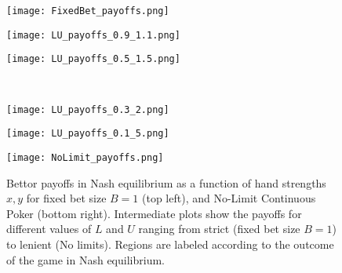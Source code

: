\documentclass[../../main/main.tex]{subfiles}
\begin{document}
\begin{figure}[h!]
    \begin{adjustwidth}{-1in}{-1in}
        \centering
        \begin{minipage}{0.4\textwidth}
            \centering
            \texttt{[image: FixedBet\_payoffs.png]}
        \end{minipage}
        \hspace{0.02\textwidth}
        \begin{minipage}{0.4\textwidth}
            \centering
            \texttt{[image: LU\_payoffs\_0.9\_1.1.png]}
        \end{minipage}
        \hspace{0.02\textwidth}
        \begin{minipage}{0.4\textwidth}
            \centering
            \texttt{[image: LU\_payoffs\_0.5\_1.5.png]}
        \end{minipage}
        \vspace{-0.5cm}\\ %
        \begin{minipage}{0.4\textwidth}
            \centering
            \texttt{[image: LU\_payoffs\_0.3\_2.png]}
        \end{minipage}
        \hspace{0.02\textwidth}
        \begin{minipage}{0.4\textwidth}
            \centering
            \texttt{[image: LU\_payoffs\_0.1\_5.png]}
        \end{minipage}
        \hspace{0.02\textwidth}
        \begin{minipage}{0.4\textwidth}
            \centering
            \texttt{[image: NoLimit\_payoffs.png]}
        \end{minipage}
    \end{adjustwidth}
    \caption{Bettor payoffs in Nash equilibrium as a function of hand strengths $x, y$ for fixed bet size $B=1$ (top left), and No-Limit Continuous Poker (bottom right). Intermediate plots show the payoffs for different values of $L$ and $U$ ranging from strict (fixed bet size $B=1$) to lenient (No limits). Regions are labeled according to the outcome of the game in Nash equilibrium.}
    \label{fig:payoffs}
\end{figure}
\end{document}

